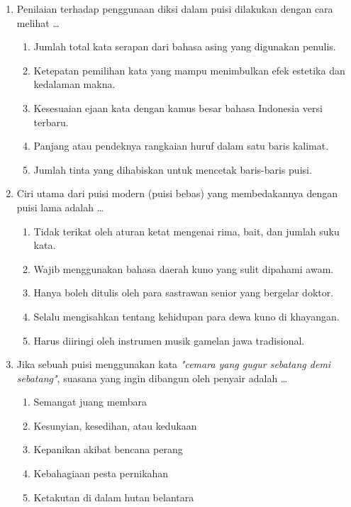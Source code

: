 \documentclass[12pt,a4paper]{article}
\begin{document}
\begin{enumerate}[leftmargin=*]
\item Penilaian terhadap penggunaan diksi dalam puisi dilakukan dengan cara melihat \dots
    \begin{enumerate}[label=\alph*.]
        \item Jumlah total kata serapan dari bahasa asing yang digunakan penulis.
        \item Ketepatan pemilihan kata yang mampu menimbulkan efek estetika dan kedalaman makna.
        \item Kesesuaian ejaan kata dengan kamus besar bahasa Indonesia versi terbaru.
        \item Panjang atau pendeknya rangkaian huruf dalam satu baris kalimat.
        \item Jumlah tinta yang dihabiskan untuk mencetak baris-baris puisi.
    \end{enumerate}

\item Ciri utama dari puisi modern (puisi bebas) yang membedakannya dengan puisi lama adalah \dots
    \begin{enumerate}[label=\alph*.]
        \item Tidak terikat oleh aturan ketat mengenai rima, bait, dan jumlah suku kata.
        \item Wajib menggunakan bahasa daerah kuno yang sulit dipahami awam.
        \item Hanya boleh ditulis oleh para sastrawan senior yang bergelar doktor.
        \item Selalu mengisahkan tentang kehidupan para dewa kuno di khayangan.
        \item Harus diiringi oleh instrumen musik gamelan jawa tradisional.
    \end{enumerate}

\item Jika sebuah puisi menggunakan kata \textit{"cemara yang gugur sebatang demi sebatang"}, suasana yang ingin dibangun oleh penyair adalah \dots
    \begin{enumerate}[label=\alph*.]
        \item Semangat juang membara
        \item Kesunyian, kesedihan, atau kedukaan
        \item Kepanikan akibat bencana perang
        \item Kebahagiaan pesta pernikahan
        \item Ketakutan di dalam hutan belantara
    \end{enumerate}


\end{enumerate}
\end{document}
